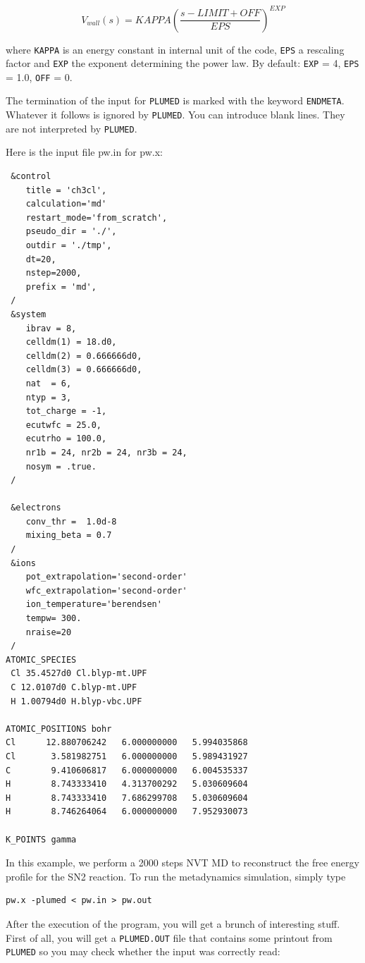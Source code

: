 \documentclass[12pt,a4paper]{article}
\begin{document}
\begin{equation}
V_{wall}(s) = KAPPA (\frac{s - LIMIT + OFF}{EPS})^{EXP}
\label{EQ_vwall}
\end{equation}

where \texttt{KAPPA} is an energy constant in internal unit of the code, \texttt{EPS} a rescaling factor and \texttt{EXP} the exponent determining the power law. By default: \texttt{EXP} = 4, \texttt{EPS} = 1.0, \texttt{OFF} = 0.

The termination of the input for \texttt{PLUMED} is marked with the keyword \texttt{ENDMETA}. Whatever it follows is ignored by \texttt{PLUMED}. You can introduce blank lines. They are not interpreted by \texttt{PLUMED}.

Here is the input file pw.in for pw.x:

\begin{verbatim}
 &control
    title = 'ch3cl',
    calculation='md'
    restart_mode='from_scratch',
    pseudo_dir = './',
    outdir = './tmp',
    dt=20,
    nstep=2000,
    prefix = 'md',
 /
 &system
    ibrav = 8,
    celldm(1) = 18.d0,
    celldm(2) = 0.666666d0,
    celldm(3) = 0.666666d0,
    nat  = 6,
    ntyp = 3,
    tot_charge = -1,
    ecutwfc = 25.0,
    ecutrho = 100.0,
    nr1b = 24, nr2b = 24, nr3b = 24,
    nosym = .true.
 /

 &electrons
    conv_thr =  1.0d-8
    mixing_beta = 0.7
 /
 &ions
    pot_extrapolation='second-order'
    wfc_extrapolation='second-order'
    ion_temperature='berendsen'
    tempw= 300.
    nraise=20
 /
ATOMIC_SPECIES
 Cl 35.4527d0 Cl.blyp-mt.UPF
 C 12.0107d0 C.blyp-mt.UPF
 H 1.00794d0 H.blyp-vbc.UPF

ATOMIC_POSITIONS bohr
Cl      12.880706242   6.000000000   5.994035868
Cl       3.581982751   6.000000000   5.989431927
C        9.410606817   6.000000000   6.004535337
H        8.743333410   4.313700292   5.030609604
H        8.743333410   7.686299708   5.030609604
H        8.746264064   6.000000000   7.952930073

K_POINTS gamma
\end{verbatim}

In this example, we perform a 2000 steps NVT MD to reconstruct the free energy profile for the SN2 reaction. To run the metadynamics simulation, simply type

\begin{verbatim}
pw.x -plumed < pw.in > pw.out
\end{verbatim}

After the execution of the program, you will get a brunch of interesting stuff. First of all, you will get a \texttt{PLUMED.OUT} file that contains some printout from \texttt{PLUMED} so you may check whether the input was correctly read:
\end{document}
